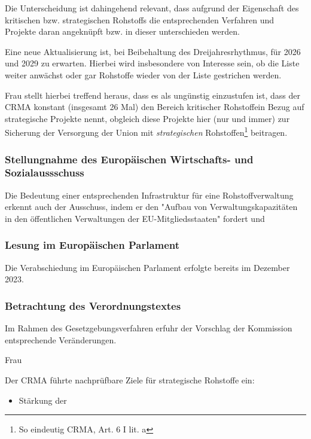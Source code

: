 \documentclass[12pt,a4paper,oneside]{book} %
\begin{document}
	
	
	Die Unterscheidung ist dahingehend relevant, dass aufgrund der Eigenschaft des kritischen bzw. strategischen Rohstoffs die entsprechenden Verfahren und Projekte daran angeknüpft bzw. in dieser unterschieden werden.
	
	Eine neue Aktualisierung ist, bei Beibehaltung des Dreijahresrhythmus, für 2026 und 2029 zu erwarten. Hierbei wird insbesondere von Interesse sein, ob die Liste weiter anwächst oder gar Rohstoffe wieder von der Liste gestrichen werden.
	
	Frau\autocite{Frau 2024, NVwZ 2024, 1874, 1875} stellt hierbei treffend heraus, dass es als ungünstig einzustufen ist, dass der CRMA konstant (insgesamt 26 Mal) den \glqq Bereich kritischer Rohstoffe\grqq in Bezug auf strategische Projekte nennt, obgleich diese Projekte hier (nur und immer) zur \glqq Sicherung der Versorgung der Union mit \textit{strategischen} Rohstoffen\grqq\footnote{So eindeutig CRMA, Art. 6 I lit. a} beitragen. 
	
	\subsubsection{Stellungnahme des Europäischen Wirtschafts- und Sozialaussschuss}
	
	Die Bedeutung einer entsprechenden Infrastruktur für eine Rohstoffverwaltung erkennt auch der Ausschuss, indem er den "Aufbau von Verwaltungskapazitäten in den öffentlichen Verwaltungen der EU-Mitgliedsstaaten" fordert %
	und 
	
	\subsubsection{Lesung im Europäischen Parlament}
	
	
	Die Verabschiedung im Europäischen Parlament erfolgte bereits im Dezember 2023.
	
	\subsubsection{Betrachtung des Verordnungstextes}
	Im Rahmen des Gesetzgebungsverfahren erfuhr der Vorschlag der Kommission entsprechende Veränderungen.
	
	Frau\autocite{Frau, NVwZ 2024, 1874}
	
	
	Der CRMA führte nachprüfbare Ziele für strategische Rohstoffe ein:
	\begin{itemize}
		\item Stärkung der 
	\end{itemize}
	
\end{document}
